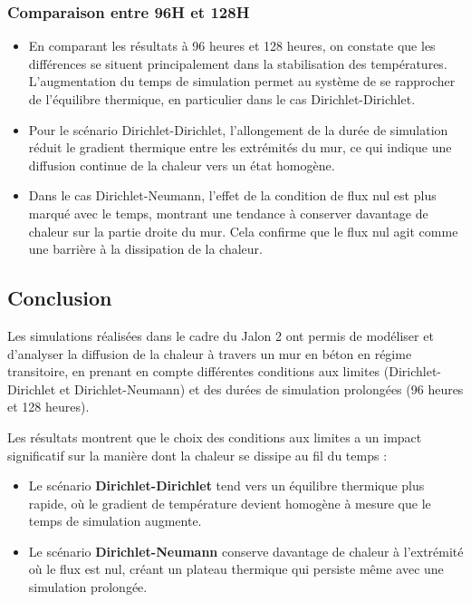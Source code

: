 \documentclass[a4paper,11pt]{article}
\begin{document}
\subsubsection{Comparaison entre 96H et 128H}
\begin{itemize}
    \item En comparant les résultats à 96 heures et 128 heures, on constate que les différences se situent principalement dans la stabilisation des températures. L'augmentation du temps de simulation permet au système de se rapprocher de l'équilibre thermique, en particulier dans le cas Dirichlet-Dirichlet.
    \item Pour le scénario Dirichlet-Dirichlet, l'allongement de la durée de simulation réduit le gradient thermique entre les extrémités du mur, ce qui indique une diffusion continue de la chaleur vers un état homogène.
    \item Dans le cas Dirichlet-Neumann, l'effet de la condition de flux nul est plus marqué avec le temps, montrant une tendance à conserver davantage de chaleur sur la partie droite du mur. Cela confirme que le flux nul agit comme une barrière à la dissipation de la chaleur.
\end{itemize}


\subsection{Conclusion}
Les simulations réalisées dans le cadre du Jalon 2 ont permis de modéliser et d'analyser la diffusion de la chaleur à travers un mur en béton en régime transitoire, en prenant en compte différentes conditions aux limites (Dirichlet-Dirichlet et Dirichlet-Neumann) et des durées de simulation prolongées (96 heures et 128 heures). 

Les résultats montrent que le choix des conditions aux limites a un impact significatif sur la manière dont la chaleur se dissipe au fil du temps :
\begin{itemize}
    \item Le scénario \textbf{Dirichlet-Dirichlet} tend vers un équilibre thermique plus rapide, où le gradient de température devient homogène à mesure que le temps de simulation augmente.
    \item Le scénario \textbf{Dirichlet-Neumann} conserve davantage de chaleur à l'extrémité où le flux est nul, créant un plateau thermique qui persiste même avec une simulation prolongée.
\end{itemize}
\end{document}
